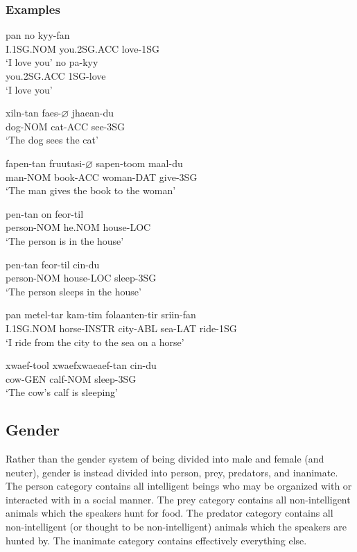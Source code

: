\documentclass[main.tex]{subfiles}
\begin{document}
\subsubsection{Examples}
\begin{exe}
    \ex
        \gll pan no kyy-fan\\
        I.1SG.NOM you.2SG.ACC love-1SG\\
        \trans `I love you'
    \ex
        \gll no pa-kyy\\
        you.2SG.ACC 1SG-love\\
        \trans `I love you'

    \ex \gll xiln-tan faes-$\varnothing$ jhaean-du\\
        dog-NOM cat-ACC see-3SG\\
        \trans `The dog sees the cat'

    \ex \gll fapen-tan fruutasi-$\varnothing$ sapen-toom maal-du\\
        man-NOM book-ACC woman-DAT give-3SG\\
        \trans `The man gives the book to the woman'

    \ex \gll pen-tan on feor-til\\
        person-NOM he.NOM house-LOC\\
        \trans `The person is in the house'

    \ex \gll pen-tan feor-til cin-du\\
        person-NOM house-LOC sleep-3SG\\
        \trans `The person sleeps in the house'

    \ex \gll pan metel-tar kam-tim folaanten-tir sriin-fan\\
        I.1SG.NOM horse-INSTR city-ABL sea-LAT ride-1SG\\
        \trans `I ride from the city to the sea on a horse'

    \ex \gll xwaef-tool xwaefxwaeaef-tan cin-du\\
        cow-GEN calf-NOM sleep-3SG\\
        \trans `The cow's calf is sleeping'
\end{exe}

\subsection{Gender}
Rather than the gender system of \name{} being divided into male and female
(and neuter), gender is instead divided into person, prey, predators, and
inanimate. The person category contains all intelligent beings who may be
organized with or interacted with in a social manner. The prey category
contains all non-intelligent animals which the speakers hunt for food. The
predator category contains all non-intelligent (or thought to be
non-intelligent) animals which the speakers are hunted by. The inanimate
category contains effectively everything else.
\end{document}
